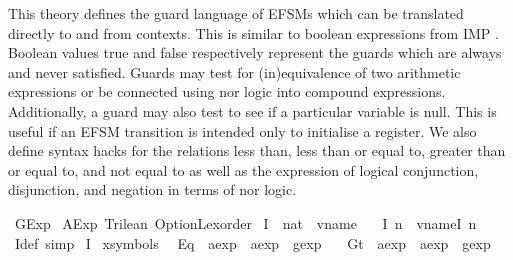 %
\begin{isabellebody}%
%
%
\isadelimdocument
%
\endisadelimdocument
%
\isatagdocument
%
\isamarkuptrue%
%
\endisatagdocument
{\isafolddocument}%
%
\isadelimdocument
%
\endisadelimdocument
%
\begin{isamarkuptext}%
This theory defines the guard language of EFSMs which can be translated directly to and from
contexts. This is similar to boolean expressions from IMP \cite{fixme}. Boolean values true and
false respectively represent the guards which are always and never satisfied. Guards may test
for (in)equivalence of two arithmetic expressions or be connected using nor logic into compound
expressions. Additionally, a guard may also test to see if a particular variable is null. This is
useful if an EFSM transition is intended only to initialise a register.  We also define syntax hacks
for the relations less than, less than or equal to, greater than or equal to, and not equal to as
well as the expression of logical conjunction, disjunction, and negation in terms of nor logic.%
\end{isamarkuptext}\isamarkuptrue%
%
\isadelimtheory
%
\endisadelimtheory
%
\isatagtheory
{}\isamarkupfalse%
\ GExp\isanewline
{}\ AExp\ Trilean\ Option{\isacharunderscore}Lexorder\isanewline
{}%
\endisatagtheory
{\isafoldtheory}%
%
\isadelimtheory
%
\endisadelimtheory
\isanewline
\isanewline
{}\isamarkupfalse%
\ I\ {\isacharcolon}{\isacharcolon}\ {\isachardoublequoteopen}nat\ {\isasymRightarrow}\ vname{\isachardoublequoteclose}\ \isanewline
\ \ {\isachardoublequoteopen}I\ n\ {\isacharequal}\ vname{\isachardot}I\ {\isacharparenleft}n{\isacharminus}{}{\isacharparenright}{\isachardoublequoteclose}\isanewline
{}\isamarkupfalse%
\ I{\isacharunderscore}def\ {\isacharbrackleft}simp{\isacharbrackright}\isanewline
{}\isamarkupfalse%
\ I%
\isamarkupfalse%
\ {\isacharparenleft}xsymbols{\isacharparenright}\isanewline
\ \ Eq\ {\isacharcolon}{\isacharcolon}\ {\isachardoublequoteopen}aexp\ {\isasymRightarrow}\ aexp\ {\isasymRightarrow}\ gexp{\isachardoublequoteclose}\ \isanewline
\ \ Gt\ {\isacharcolon}{\isacharcolon}\ {\isachardoublequoteopen}aexp\ {\isasymRightarrow}\ aexp\ {\isasymRightarrow}\ gexp{\isachardoublequoteclose}\ \isanewline

\end{isabellebody}
